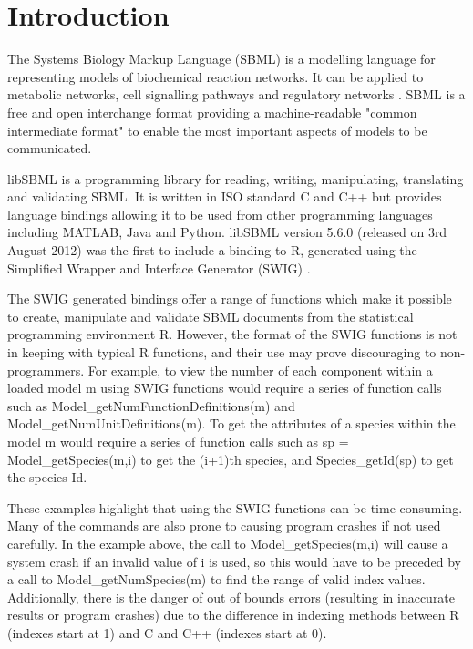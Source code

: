 \documentclass{bioinfo}
\begin{document}
\section{Introduction}

The Systems Biology Markup Language (SBML) is a modelling language for representing models of biochemical reaction networks. It can be applied to metabolic networks, cell signalling pathways and regulatory networks \citep{Hucka_01}. SBML is a free and open interchange format providing a machine-readable "common intermediate format" to enable the most important aspects of models to be communicated.

\par libSBML \citep{Bornstein_01} is a programming library for reading, writing, manipulating, translating and validating SBML. It is written in ISO standard C and C++ but provides language bindings allowing it to be used from other programming languages including MATLAB, Java and Python. libSBML version 5.6.0 (released on 3rd August 2012) was the first to include a binding to R, generated using the Simplified Wrapper and Interface Generator (SWIG) \citep{Beazley_01}.

\par The SWIG generated bindings offer a range of functions which make it possible to create, manipulate and validate SBML documents from the statistical programming environment R. However, the format of the SWIG functions is not in keeping with typical R functions, and their use may prove discouraging to non-programmers. For example, to view the number of each component within a loaded model {\selectfont m} using SWIG functions would require a series of function calls such as {\selectfont Model\_getNumFunctionDefinitions(m)} and {\selectfont Model\_getNumUnitDefinitions(m)}. To get the attributes of a species within the model m would require a series of function calls such as {\selectfont sp = Model\_getSpecies(m,i)} to get the (i+1)th species, and {\selectfont Species\_getId(sp)} to get the species Id.

\par These examples highlight that using the SWIG functions can be time consuming. Many of the commands are also prone to causing program crashes if not used carefully. In the example above, the call to {\selectfont Model\_getSpecies(m,i)} will cause a system crash if an invalid value of i is used, so this would have to be preceded by a call to {\selectfont Model\_getNumSpecies(m)} to find the range of valid index values. Additionally, there is the danger of out of bounds errors (resulting in inaccurate results or program crashes) due to the difference in indexing methods between R (indexes start at 1) and C and C++ (indexes start at 0).
\end{document}
